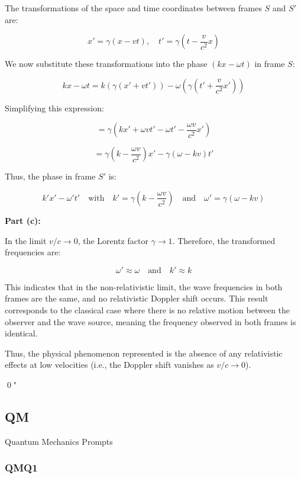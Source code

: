 The transformations of the space and time coordinates between frames \( S \) and \( S' \) are:

\[
x' = \gamma (x - vt), \quad t' = \gamma \left( t - \frac{v}{c^2} x \right)
\]

We now substitute these transformations into the phase \( (k x - \omega t) \) in frame \( S \):

\[
k x - \omega t = k \left( \gamma (x' + v t') \right) - \omega \left( \gamma \left( t' + \frac{v}{c^2} x' \right) \right)
\]

Simplifying this expression:

\[
= \gamma \left( k x' + \omega v t' - \omega t' - \frac{\omega v}{c^2} x' \right)
\]

\[
= \gamma \left( k - \frac{\omega v}{c^2} \right) x' - \gamma (\omega - kv) t'
\]

Thus, the phase in frame \( S' \) is:

\[
k' x' - \omega' t' \quad \text{with} \quad k' = \gamma \left( k - \frac{\omega v}{c^2} \right) \quad \text{and} \quad \omega' = \gamma (\omega - k v)
\]

\textbf{Part (c):}

In the limit \( v/c \to 0 \), the Lorentz factor \( \gamma \to 1 \). Therefore, the transformed frequencies are:

\[
\omega' \approx \omega \quad \text{and} \quad k' \approx k
\]

This indicates that in the non-relativistic limit, the wave frequencies in both frames are the same, and no relativistic Doppler shift occurs. This result corresponds to the classical case where there is no relative motion between the observer and the wave source, meaning the frequency observed in both frames is identical.

Thus, the physical phenomenon represented is the absence of any relativistic effects at low velocities (i.e., the Doppler shift vanishes as \( v/c \to 0 \)).

\qed"



\subsection{QM}

Quantum Mechanics Prompts

\subsubsection{QMQ1}

